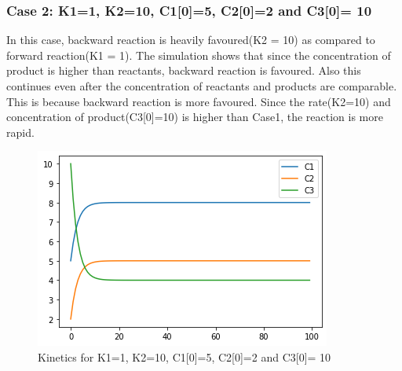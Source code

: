 \documentclass[10pt,journal,cspaper,compsoc]{IEEEtran}
\begin{document}
    \subsubsection*{Case 2: K1=1, K2=10, C1[0]=5, C2[0]=2 and C3[0]= 10}
    In this case, backward reaction is heavily favoured(K2 = 10) as compared to forward reaction(K1 = 1).
    The simulation shows that since the concentration of product is higher than reactants, backward reaction is favoured. 
    Also this continues even after the concentration of reactants and products are comparable.
    This is because backward reaction is more favoured.
    Since the rate(K2=10) and concentration of product(C3[0]=10) is higher than Case1, the reaction is more rapid.
    \begin{figure}[h!]
      \centering
      \includegraphics[scale = 0.5]{images/Exp1_Example2.png}
      \caption{Kinetics for K1=1, K2=10, C1[0]=5, C2[0]=2 and C3[0]= 10}
    \end{figure}

    
\end{document}
